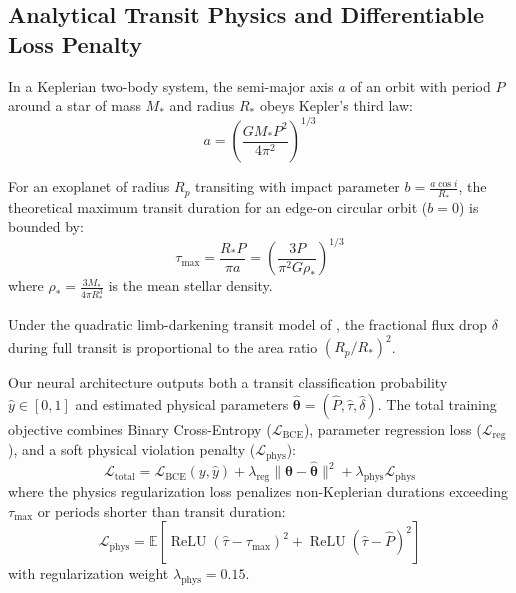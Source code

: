 \documentclass[11pt,a4paper]{article}
\begin{document}
\subsection{Analytical Transit Physics and Differentiable Loss Penalty}

In a Keplerian two-body system, the semi-major axis $a$ of an orbit with period $P$ around a star of mass $M_*$ and radius $R_*$ obeys Kepler's third law:
\begin{equation}
    a = \left( \frac{G M_* P^2}{4\pi^2} \right)^{1/3}
\end{equation}

For an exoplanet of radius $R_p$ transiting with impact parameter $b = \frac{a \cos i}{R_*}$, the theoretical maximum transit duration for an edge-on circular orbit ($b=0$) is bounded by:
\begin{equation}
    \tau_{\text{max}} = \frac{R_* P}{\pi a} = \left( \frac{3 P}{\pi^2 G \rho_*} \right)^{1/3}
\end{equation}
where $\rho_* = \frac{3 M_*}{4 \pi R_*^3}$ is the mean stellar density.

Under the quadratic limb-darkening transit model of \citet{mandel2002analytic}, the fractional flux drop $\delta$ during full transit is proportional to the area ratio $(R_p / R_*)^2$.

Our neural architecture outputs both a transit classification probability $\hat{y} \in [0, 1]$ and estimated physical parameters $\hat{\boldsymbol{\theta}} = (\hat{P}, \hat{\tau}, \hat{\delta})$. The total training objective combines Binary Cross-Entropy ($\mathcal{L}_{\text{BCE}}$), parameter regression loss ($\mathcal{L}_{\text{reg}}$), and a soft physical violation penalty ($\mathcal{L}_{\text{phys}}$):
\begin{equation}
    \mathcal{L}_{\text{total}} = \mathcal{L}_{\text{BCE}}(y, \hat{y}) + \lambda_{\text{reg}} \|\boldsymbol{\theta} - \hat{\boldsymbol{\theta}}\|^2 + \lambda_{\text{phys}} \mathcal{L}_{\text{phys}}
\end{equation}
where the physics regularization loss penalizes non-Keplerian durations exceeding $\tau_{\text{max}}$ or periods shorter than transit duration:
\begin{equation}
    \mathcal{L}_{\text{phys}} = \mathbb{E}\left[ \operatorname{ReLU}(\hat{\tau} - \tau_{\text{max}})^2 + \operatorname{ReLU}(\hat{\tau} - \hat{P})^2 \right]
\end{equation}
with regularization weight $\lambda_{\text{phys}} = 0.15$.
\end{document}
